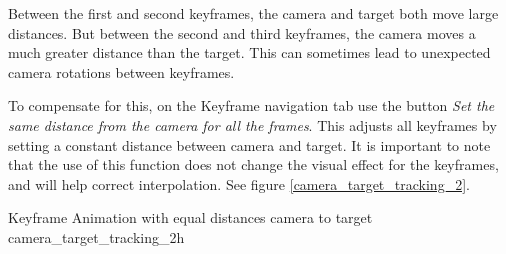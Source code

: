 Between the first and second keyframes, the camera and target both move large
distances. But between the second and third keyframes, the camera moves a much
greater distance than the target. This can sometimes lead to unexpected camera
rotations between keyframes.

To compensate for this, on the Keyframe navigation tab use the button \emph{Set the
same distance from the camera for all the frames}. This adjusts all keyframes by
setting a constant distance between camera and target. It is important to note
that the use of this function does not change the visual effect for the
keyframes, and will help correct interpolation. See figure \ref{camera_target_tracking_2}.

{Keyframe Animation with equal distances camera to target}
{camera_target_tracking_2}{h}
